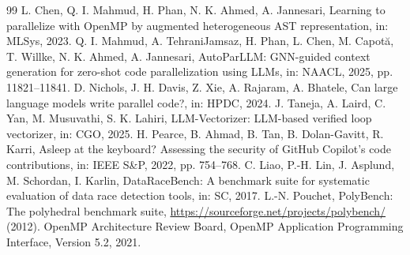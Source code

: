 \begin{thebibliography}{99}
 L. Chen, Q. I. Mahmud, H. Phan, N. K. Ahmed, A. Jannesari, Learning to parallelize with OpenMP by augmented heterogeneous AST representation, in: MLSys, 2023.
 Q. I. Mahmud, A. TehraniJamsaz, H. Phan, L. Chen, M. Capot\u{a}, T. Willke, N. K. Ahmed, A. Jannesari, AutoParLLM: GNN-guided context generation for zero-shot code parallelization using LLMs, in: NAACL, 2025, pp. 11821--11841.
 D. Nichols, J. H. Davis, Z. Xie, A. Rajaram, A. Bhatele, Can large language models write parallel code?, in: HPDC, 2024.
 J. Taneja, A. Laird, C. Yan, M. Musuvathi, S. K. Lahiri, LLM-Vectorizer: LLM-based verified loop vectorizer, in: CGO, 2025.
 H. Pearce, B. Ahmad, B. Tan, B. Dolan-Gavitt, R. Karri, Asleep at the keyboard? Assessing the security of GitHub Copilot's code contributions, in: IEEE S\&P, 2022, pp. 754--768.
 C. Liao, P.-H. Lin, J. Asplund, M. Schordan, I. Karlin, DataRaceBench: A benchmark suite for systematic evaluation of data race detection tools, in: SC, 2017.
 L.-N. Pouchet, PolyBench: The polyhedral benchmark suite, \url{https://sourceforge.net/projects/polybench/} (2012).
 OpenMP Architecture Review Board, OpenMP Application Programming Interface, Version 5.2, 2021.
\end{thebibliography}
